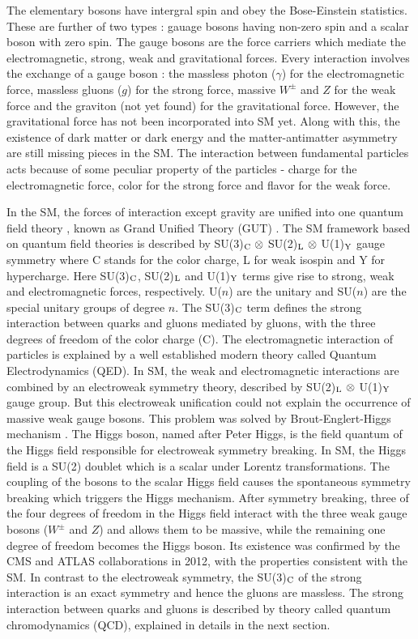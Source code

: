 The elementary bosons have intergral spin and obey the Bose-Einstein statistics. These are further of two types : gauage bosons having non-zero spin and a scalar boson with zero spin. The gauge bosons are the force carriers which mediate the electromagnetic, strong, weak and gravitational forces. Every interaction involves the exchange of a gauge boson : the massless photon ($\gamma$) for the electromagnetic force, massless gluons ($g$) for the strong force, massive $W^\pm$ and $Z$ for the weak force and the graviton (not yet found) for the gravitational force. However, the gravitational force has not been incorporated into SM yet. Along with this, the existence of dark matter or dark energy and the matter-antimatter asymmetry are still missing pieces in the SM. The interaction between fundamental particles acts because of some peculiar property of the particles - charge for the electromagnetic force, color for the strong force and flavor for the weak force. 

In the SM, the forces of interaction except gravity are unified into one quantum field theory \cite{Peskin:1995ev}, known as Grand Unified Theory (GUT) \cite{Glashow:1979pj,Salam:1980jd,Georgi:1974sy}. The SM framework based on quantum field theories is described by SU(3)$_{\rm C}~\otimes$ SU(2)$_{\rm L}~\otimes$ U(1)$_{\rm Y}$ gauge symmetry where C stands for the color charge, L for weak isospin and Y for hypercharge. Here SU(3)$_{\rm C}$, SU(2)$_{\rm L}$ and U(1)$_{\rm Y}$ terms give rise to strong, weak and electromagnetic forces, respectively. U($n$) are the unitary and SU($n$) are the special unitary groups of degree $n$. The SU(3)$_{\rm C}$ term defines the strong interaction between quarks and gluons mediated by gluons, with the three degrees of freedom of the color charge (C). The electromagnetic interaction of particles is explained by a well established modern theory called Quantum Electrodynamics (QED). In SM, the weak and electromagnetic interactions are combined by an electroweak symmetry theory, described by SU(2)$_{\rm L}~\otimes$ U(1)$_{\rm Y}$ gauge group. But this electroweak unification could not explain the occurrence of massive weak gauge bosons. This problem was solved by Brout-Englert-Higgs mechanism \cite{Higgs:1964pj,Englert:1964et}. The Higgs boson, named after Peter Higgs, is the field quantum of the Higgs field responsible for electroweak symmetry breaking. In SM, the Higgs field is a SU(2) doublet which is a scalar under Lorentz transformations. The coupling of the bosons to the scalar Higgs field causes the spontaneous symmetry breaking which triggers the Higgs mechanism. After symmetry breaking, three of the four degrees of freedom in the Higgs field interact with the three weak gauge bosons ($W^\pm$ and $Z$) and allows them to be massive, while the remaining one degree of freedom becomes the Higgs boson. Its existence was confirmed by the CMS \cite{Chatrchyan:2012xdj} and ATLAS \cite{Aad:2012tfa} collaborations in 2012, with the properties consistent with the SM. In contrast to the electroweak symmetry, the SU(3)$_{\rm C}$ of the strong interaction is an exact symmetry and hence the gluons are massless. The strong interaction between quarks and gluons is described by theory called quantum chromodynamics (QCD), explained in details in the next section.


